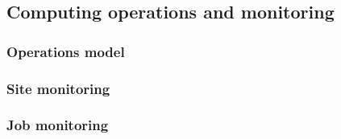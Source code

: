 \subsection{Computing operations and monitoring}

\subsubsection{Operations model}

\subsubsection{Site monitoring}

\subsubsection{Job monitoring}

